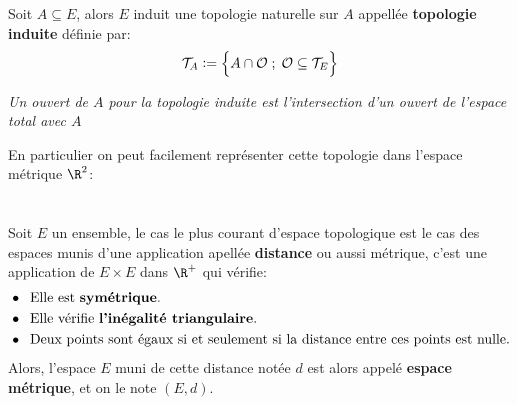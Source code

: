\subsection*{}
Soit \(A \subseteq E\), alors \(E\) induit une topologie naturelle sur \(A\) appellée \textbf{topologie induite} définie par:
\[
   \mathcal{T}_A := \Bigl\{ A \cap \mathcal{O} \; ; \; \mathcal{O} \subseteq \mathcal{T}_E \Bigl\}  
\]
\begin{center}
   \textit{Un ouvert de \(A\) pour la topologie induite est l'intersection d'un ouvert de l'espace total avec \(A\)}
\end{center}
En particulier on peut facilement représenter cette topologie dans l'espace métrique \(\R^2\):
\begin{center}
\end{center}

\chapter*{}
Soit \(E\) un ensemble, le cas le plus courant d'espace topologique est le cas des espaces munis d'une application apellée \textbf{distance} ou aussi métrique, c'est une application de \(E \times E\) dans \(\R^+\) qui vérifie:
\begin{align*}
   &\bullet \;\; \text{Elle est \textbf{symétrique}.} \\
   &\bullet \;\; \text{Elle vérifie \textbf{l'inégalité triangulaire}.} \\
   &\bullet \;\; \text{Deux points sont égaux si et seulement si la distance entre ces points est nulle.}
\end{align*}
Alors, l'espace \(E\) muni de cette distance notée \(d\) est alors appelé \textbf{espace métrique}, et on le note \((E, d)\).\<

